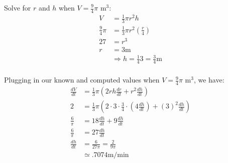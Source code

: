 \documentclass{ximera}
\begin{document}
\begin{exercise}
\begin{hint}
Solve for $r$ and $h$ when $V=\frac{9}{4}\pi$ m$^3$: \begin{align*}
V &= \frac{1}{3}\pi r^2h \\
\frac{9}{4}\pi &= \frac{1}{3}\pi r^2\left(\frac{r}{4}\right) \\
27 &= r^3 \\
r &= 3 \mbox{m} \\
&\Rightarrow h= \frac{1}{4}3 = \frac{3}{4} \mbox{m} \\
\end{align*}

Plugging in our known and computed values when $V=\frac{9}{4}\pi$ m$^3$,
we have: \begin{align*}
\frac{dV}{dt} &= \frac{1}{3}\pi\left(2rh\frac{dr}{dt}+r^2\frac{dh}{dt}\right) \\
2 &= \frac{1}{3}\pi \left(2\cdot 3 \cdot \frac{3}{4}\cdot\left(4\frac{dh}{dt}\right)+\left(3\right)^2\frac{dh}{dt}\right) \\
\frac{6}{\pi} &= 18\frac{dh}{dt} + 9\frac{dh}{dt} \\
\frac{6}{\pi} &= 27\frac{dh}{dt} \\
\frac{dh}{dt} &= \frac{6}{27\pi} = \frac{2}{9\pi} \\
& \simeq .7074 \mbox{m/min} 
\end{align*}
\end{hint}


\begin{multipleChoice}
\end{multipleChoice}

\end{exercise}
\end{document}
